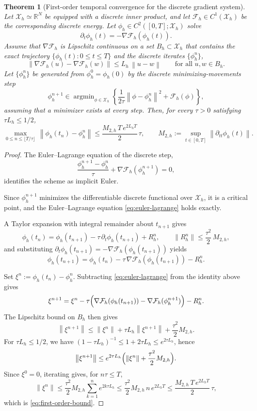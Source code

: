 \documentclass[11pt,letterpaper]{article}
\theoremstyle{plain}
\newtheorem{theorem}{Theorem}[section]
\theoremstyle{definition}
\newcommand{\ph}{\phi}%
\newcommand{\grad}{\nabla}%
\newcommand{\norm}[1]{\left\| #1 \right\|}
\newcommand{\E}{\mathcal{F}}
\newcommand{\X}{\mathcal{X}}
\newcommand{\argmin}{\mathop{\mathrm{argmin}}}
\begin{document}
\begin{theorem}[First-order temporal convergence for the discrete gradient system]
\label{thm:first_order}
Let $\X_h\simeq\mathbb{R}^N$ be equipped with a discrete inner product, and let $\E_h\in C^1(\X_h)$ be the corresponding discrete energy. Let $\ph_h\in C^2([0,T];\X_h)$ solve
\[
\partial_t\phi_h(t)=-\grad\E_h(\phi_h(t)).
\]
Assume that $\grad\E_h$ is Lipschitz continuous on a set $B_h\subset\X_h$ that contains the exact trajectory $\{\phi_h(t):0\le t\le T\}$ and the discrete iterates $\{\phi_h^n\}$,
\[
\norm{\grad\E_h(u)-\grad\E_h(w)} \le L_h\,\norm{u-w}
\qquad \text{for all } u,w\in B_h.
\]
Let $\{\phi_h^n\}$ be generated from $\phi_h^0=\phi_h(0)$ by the discrete minimizing-movements step
\[
\phi_h^{n+1}\in
\argmin_{\phi\in\X_h}
\left\{
\frac{1}{2\tau}\norm{\phi-\phi_h^n}^2+\E_h(\phi)
\right\},
\]
assuming that a minimizer exists at every step. Then, for every $\tau>0$ satisfying $\tau L_h\le 1/2$,
\begin{equation}
\max_{0\le n\le \lfloor T/\tau\rfloor}\,
\norm{\phi_h(t_n)-\phi_h^n}
\le
\frac{M_{2,h}\,T\,e^{2L_hT}}{2}\,\tau,
\qquad
M_{2,h}:=\sup_{t\in[0,T]}\norm{\partial_{tt}\phi_h(t)} .
\label{eq:first-order-bound}
\end{equation}
\end{theorem}

\begin{proof}

The Euler--Lagrange equation of the discrete step,
\begin{equation}
\frac{\phi_h^{n+1}-\phi_h^n}{\tau}
+\grad\E_h(\phi_h^{n+1})=0,
\label{eq:euler-lagrange}
\end{equation}
identifies the scheme as implicit Euler.

Since $\phi_h^{n+1}$ minimizes the differentiable discrete functional over $\X_h$, it is a critical point, and the Euler--Lagrange equation \eqref{eq:euler-lagrange} holds exactly.

A Taylor expansion with integral remainder about $t_{n+1}$ gives
\[
\phi_h(t_n)=\phi_h(t_{n+1})-\tau\,\partial_t\phi_h(t_{n+1})+R_h^n,
\qquad
\norm{R_h^n}\le\frac{\tau^2}{2}\,M_{2,h},
\]
and substituting $\partial_t\phi_h(t_{n+1})=-\grad\E_h(\phi_h(t_{n+1}))$ yields
\[
\phi_h(t_{n+1})
=
\phi_h(t_n)-\tau\,\grad\E_h(\phi_h(t_{n+1}))-R_h^n .
\]

Set $\xi^n:=\phi_h(t_n)-\phi_h^n$. Subtracting \eqref{eq:euler-lagrange} from the identity above gives
\[
\xi^{n+1}
=
\xi^n
-\tau\Bigl(\grad\E_h(\phi_h(t_{n+1}))
-\grad\E_h(\phi_h^{n+1})\Bigr)
-R_h^n .
\]
The Lipschitz bound on $B_h$ then gives
\[
\norm{\xi^{n+1}}
\le
\norm{\xi^n}+\tau L_h\norm{\xi^{n+1}}
+\frac{\tau^2}{2}M_{2,h}.
\]
For $\tau L_h\le 1/2$, we have $(1-\tau L_h)^{-1}\le 1+2\tau L_h\le e^{2\tau L_h}$, hence
\[
\norm{\xi^{n+1}}
\le
e^{2\tau L_h}
\Bigl(\norm{\xi^n}+\frac{\tau^2}{2}M_{2,h}\Bigr).
\]
Since $\xi^0=0$, iterating gives, for $n\tau\le T$,
\[
\norm{\xi^n}
\le
\frac{\tau^2}{2}M_{2,h}\sum_{k=1}^{n} e^{2k\tau L_h}
\le
\frac{\tau^2}{2}M_{2,h}\,n\,e^{2L_hT}
\le
\frac{M_{2,h}\,T\,e^{2L_hT}}{2}\,\tau,
\]
which is \eqref{eq:first-order-bound}.
\end{proof}
\end{document}
